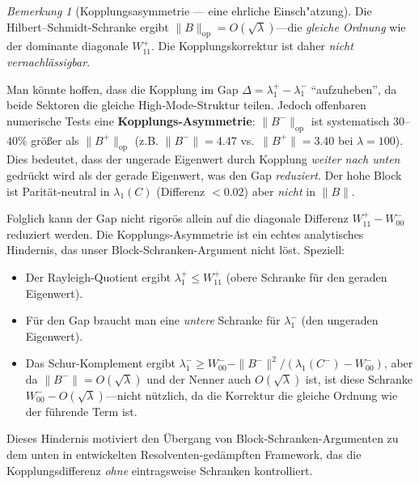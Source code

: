 \documentclass[12pt,a4paper]{article}
\theoremstyle{definition}
\theoremstyle{remark}
\newtheorem{remark}[theorem]{Bemerkung}
\begin{document}
\begin{remark}[Kopplungsasymmetrie --- eine ehrliche Einsch"atzung]
\label{rem:coupling-revisited}
Die Hilbert--Schmidt-Schranke ergibt $\|B\|_{\mathrm{op}} = O(\sqrt{\lambda})$---die \emph{gleiche Ordnung} wie der dominante diagonale $W_{11}^+$. Die Kopplungskorrektur ist daher \emph{nicht vernachlässigbar}.

Man könnte hoffen, dass die Kopplung im Gap $\Delta = \lambda_1^+ - \lambda_1^-$ ``aufzuheben'', da beide Sektoren die gleiche High-Mode-Struktur teilen. Jedoch offenbaren numerische Tests eine \textbf{Kopplungs-Asymmetrie}: $\|B^-\|_{\mathrm{op}}$ ist systematisch $30$--$40\%$ größer als $\|B^+\|_{\mathrm{op}}$ (z.B. $\|B^-\| = 4.47$ vs.\ $\|B^+\| = 3.40$ bei $\lambda = 100$). Dies bedeutet, dass der ungerade Eigenwert durch Kopplung \emph{weiter nach unten} gedrückt wird als der gerade Eigenwert, was den Gap \emph{reduziert}. Der hohe Block ist Parität-neutral in $\lambda_1(C)$ (Differenz $< 0.02$) aber \emph{nicht} in $\|B\|$.

Folglich kann der Gap nicht rigorös allein auf die diagonale Differenz $W_{11}^+ - W_{00}^-$ reduziert werden. Die Kopplungs-Asymmetrie ist ein echtes analytisches Hindernis, das unser Block-Schranken-Argument nicht löst. Speziell:
\begin{itemize}
  \item Der Rayleigh-Quotient ergibt $\lambda_1^+ \leq W_{11}^+$ (obere Schranke für den geraden Eigenwert).
  \item Für den Gap braucht man eine \emph{untere} Schranke für $\lambda_1^-$ (den ungeraden Eigenwert).
  \item Das Schur-Komplement ergibt $\lambda_1^- \geq W_{00}^- - \|B^-\|^2/(\lambda_1(C^-) - W_{00}^-)$, aber da $\|B^-\| = O(\sqrt{\lambda})$ und der Nenner auch $O(\sqrt{\lambda})$ ist, ist diese Schranke $W_{00}^- - O(\sqrt{\lambda})$---nicht nützlich, da die Korrektur die gleiche Ordnung wie der führende Term ist.
\end{itemize}
Dieses Hindernis motiviert den Übergang von Block-Schranken-Argumenten zu dem unten in  entwickelten Resolventen-gedämpften Framework, das die Kopplungsdifferenz \emph{ohne} eintragsweise Schranken kontrolliert.
\end{remark}
\end{document}
